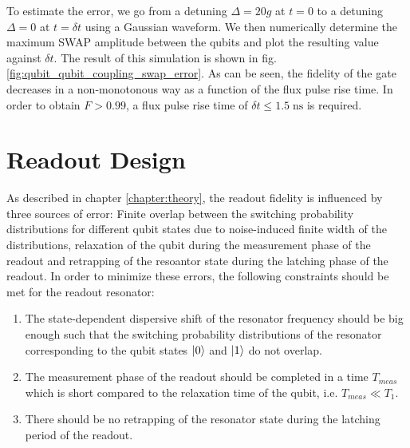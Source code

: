 To estimate the error, we go from a detuning $\Delta = 20 g$ at $t=0$ to a detuning $\Delta=0$ at $t=\delta t$ using a Gaussian waveform. We then numerically determine the maximum SWAP amplitude between the qubits and plot the resulting value against $\delta t$. The result of this simulation is shown in fig. \ref{fig:qubit_qubit_coupling_swap_error}. As can be seen, the fidelity of the gate decreases in a non-monotonous way as a function of the flux pulse rise time. In order to obtain $F>0.99$, a flux pulse rise time of $\delta t \le 1.5\;\mathrm{ns}$ is required.

\section{Readout Design}

As described in chapter \ref{chapter:theory}, the readout fidelity is influenced by three sources of error: Finite overlap between the switching probability distributions for different qubit states due to noise-induced finite width of the distributions, relaxation of the qubit during the measurement phase of the readout and retrapping of the resoantor state during the latching phase of the readout. In order to minimize these errors, the following constraints should be met for the readout resonator:

\begin{enumerate}
\item The state-dependent dispersive shift of the resonator frequency should be big enough such that the switching probability distributions of the resonator corresponding to the qubit states $\left| 0 \right>$ and $\left| 1 \right>$ do not overlap.
\item The measurement phase of the readout should be completed in a time $T_{meas}$ which is short compared to the relaxation time of the qubit, i.e. $T_{meas}\ll T_1$.
\item There should be no retrapping of the resonator state during the latching period of the readout.
\end{enumerate}


